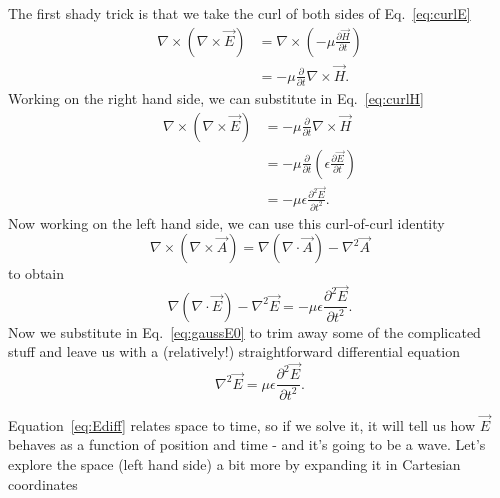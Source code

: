 \documentclass{tufte-handout}
\begin{document}
The first shady trick is that we take the curl of both sides of Eq.~\ref{eq:curlE}
\begin{align}
\nabla\times\left(\nabla\times\vec{E}\right) & = \nabla\times\left(-\mu\frac{\partial \vec{H}}{\partial t} \right) \\
 & = -\mu \frac{\partial}{\partial t}\nabla\times{}\vec{H}.\label{eq:curlcurlE} 
\end{align}
Working on the right hand side, we can substitute in Eq.~\ref{eq:curlH}\marginnote{\[ \nabla\times\vec{H} = \epsilon\frac{\partial\vec{E}}{\partial t}\]}
\begin{align}
\nabla\times\left(\nabla\times\vec{E}\right) &= -\mu \frac{\partial}{\partial t}\nabla\times{}\vec{H} \\
&= -\mu \frac{\partial}{\partial t}\left(\epsilon\frac{\partial\vec{E}}{\partial t}\right) \\
&= -\mu\epsilon \frac{\partial^2\vec{E}}{\partial t^2}.
\end{align}
Now working on the left hand side, we can use this curl-of-curl identity
\begin{equation}
\nabla\times\left(\nabla\times\vec{A}\right)=\nabla\left(\nabla\cdot\vec{A}\right) - \nabla^{2}\vec{A} \label{eq:curlofcurl}
\end{equation}
to obtain
\begin{equation}
\nabla\left(\nabla\cdot\vec{E}\right) - \nabla^{2}\vec{E}= -\mu\epsilon \frac{\partial^2\vec{E}}{\partial t^2}.
\end{equation}
Now we substitute in Eq.~\ref{eq:gaussE0}\marginnote{\[\nabla\cdot\vec{E} = 0\]} to trim away some of the complicated stuff and leave us with a (relatively!) straightforward differential equation \marginnote{\[\nabla{}0=0\]}
\begin{equation}
 \nabla^{2}\vec{E}= \mu\epsilon \frac{\partial^2\vec{E}}{\partial t^2}.\label{eq:Ediff}
\end{equation}

Equation~\ref{eq:Ediff} relates space to time, so if we solve it, it will tell us how $\vec{E}$ behaves as a function of position and time - and it's going to be a wave. Let's explore the space (left hand side) a bit more by expanding it in Cartesian coordinates
\end{document}
